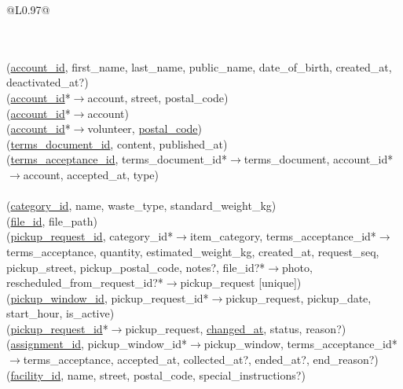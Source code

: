 \documentclass[11pt,letterpaper]{article}
\begin{document}
{\small
\begin{longtable}{@{}L{0.97\linewidth}@{}}
\caption{Complete relational schema}\label{tab:schema}\\
\toprule
\endfirsthead
\toprule
\endhead
\bottomrule
\endfoot
{} \\
(\underline{account\_id}, first\_name, last\_name, public\_name, date\_of\_birth, created\_at, deactivated\_at?) \\
(\underline{account\_id}*$\rightarrow$account, street, postal\_code) \\
(\underline{account\_id}*$\rightarrow$account) \\
(\underline{account\_id}*$\rightarrow$volunteer, \underline{postal\_code}) \\
(\underline{terms\_document\_id}, content, published\_at) \\
(\underline{terms\_acceptance\_id}, terms\_document\_id*$\rightarrow$terms\_document, account\_id*$\rightarrow$account, accepted\_at, type) \\
\addlinespace
{} \\
(\underline{category\_id}, name, waste\_type, standard\_weight\_kg) \\
(\underline{file\_id}, file\_path) \\
(\underline{pickup\_request\_id}, category\_id*$\rightarrow$item\_category, terms\_acceptance\_id*$\rightarrow$terms\_acceptance, quantity, estimated\_weight\_kg, created\_at, request\_seq, pickup\_street, pickup\_postal\_code, notes?, file\_id?*$\rightarrow$photo, rescheduled\_from\_request\_id?*$\rightarrow$pickup\_request [unique]) \\
(\underline{pickup\_window\_id}, pickup\_request\_id*$\rightarrow$pickup\_request, pickup\_date, start\_hour, is\_active) \\
(\underline{pickup\_request\_id}*$\rightarrow$pickup\_request, \underline{changed\_at}, status, reason?) \\
(\underline{assignment\_id}, pickup\_window\_id*$\rightarrow$pickup\_window, terms\_acceptance\_id*$\rightarrow$terms\_acceptance, accepted\_at, collected\_at?, ended\_at?, end\_reason?) \\
(\underline{facility\_id}, name, street, postal\_code, special\_instructions?) \\

\end{longtable}}
\end{document}
